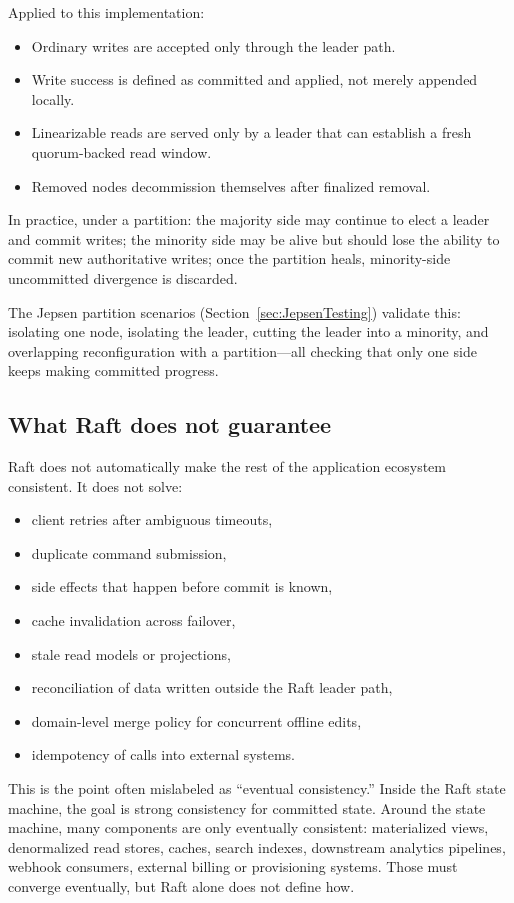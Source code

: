Applied to this implementation:

\begin{itemize}
\item Ordinary writes are accepted only through the leader path.
\item Write success is defined as committed and applied, not merely appended
locally.
\item Linearizable reads are served only by a leader that can establish a
fresh quorum-backed read window.
\item Removed nodes decommission themselves after finalized removal.
\end{itemize}

In practice, under a partition: the majority side may continue to elect a
leader and commit writes; the minority side may be alive but should lose
the ability to commit new authoritative writes; once the partition heals,
minority-side uncommitted divergence is discarded.

The Jepsen partition scenarios (Section~\ref{sec:JepsenTesting}) validate
this: isolating one node, isolating the leader, cutting the leader into a
minority, and overlapping reconfiguration with a partition---all checking
that only one side keeps making committed progress.

\subsection{What Raft does not guarantee}

Raft does not automatically make the rest of the application ecosystem
consistent. It does not solve:

\begin{itemize}
\item client retries after ambiguous timeouts,
\item duplicate command submission,
\item side effects that happen before commit is known,
\item cache invalidation across failover,
\item stale read models or projections,
\item reconciliation of data written outside the Raft leader path,
\item domain-level merge policy for concurrent offline edits,
\item idempotency of calls into external systems.
\end{itemize}

This is the point often mislabeled as ``eventual consistency.'' Inside the
Raft state machine, the goal is strong consistency for committed state.
Around the state machine, many components are only eventually consistent:
materialized views, denormalized read stores, caches, search indexes,
downstream analytics pipelines, webhook consumers, external billing or
provisioning systems. Those must converge eventually, but Raft alone does
not define how.

